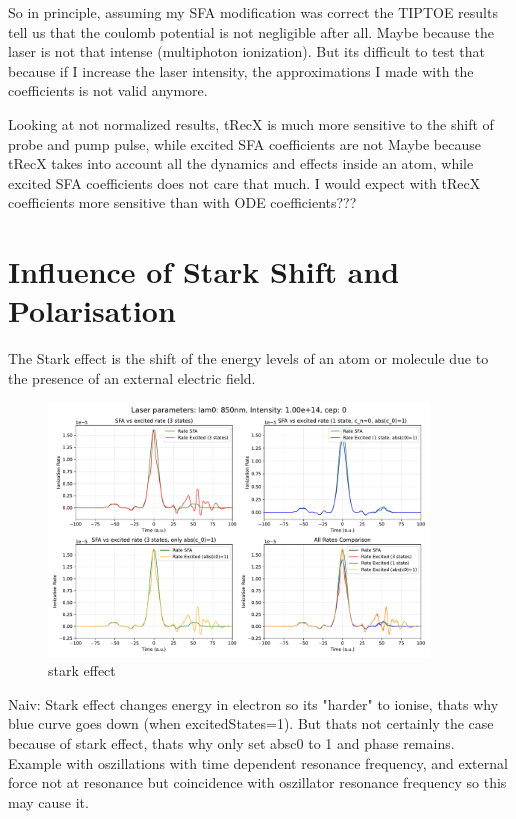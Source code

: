 So in principle, assuming my SFA modification was correct the TIPTOE results tell us that the coulomb potential is not negligible after all. 
Maybe because the laser is not that intense (multiphoton ionization).
But its difficult to test that because if I increase the laser intensity, the approximations I made with the coefficients is not valid anymore.

Looking at not normalized results, tRecX is much more sensitive to the shift of probe and pump pulse, while excited SFA coefficients are not
Maybe because tRecX takes into account all the dynamics and effects inside an atom, while excited SFA coefficients does not care that much.
I would expect with tRecX coefficients more sensitive than with ODE coefficients???

\section{Influence of Stark Shift and Polarisation}
The Stark effect is the shift of the energy levels of an atom or molecule due to the presence of an external electric field.

\begin{figure}[H]
    \centering
    \includegraphics[width=0.9\textwidth]{figures/rate4_850_1.00e+14_onlystark.pdf}
    \caption{stark effect}
    \label{fig:starkeffect}
\end{figure}

Naiv: Stark effect changes energy in electron so its "harder" to ionise, thats why blue curve goes down (when excitedStates=1). 
But thats not certainly the case because of stark effect, thats why only set absc0 to 1 and phase remains. 
Example with oszillations with time dependent resonance frequency, and external force not at resonance but coincidence with oszillator resonance frequency so this may cause it.

